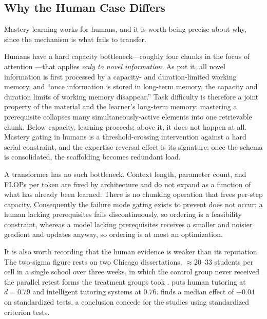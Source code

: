 \documentclass[11pt]{article}
\theoremstyle{plain}
\theoremstyle{definition}
\theoremstyle{remark}
\begin{document}
\subsection{Why the Human Case Differs}
\label{sec:human}

Mastery learning works for humans, and it is worth being precise about why, since
the mechanism is what fails to transfer.

Humans have a hard capacity bottleneck---roughly four chunks in the focus of
attention \citep{cowan2001magical}---that applies \emph{only to novel
information}. As \citet{sweller2019cognitive} put it, all novel information is
first processed by a capacity- and duration-limited working memory, and ``once
information is stored in long-term memory, the capacity and duration limits of
working memory disappear.'' Task difficulty is therefore a joint property of the
material and the learner's long-term memory: mastering a prerequisite collapses
many simultaneously-active elements into one retrievable chunk. Below capacity,
learning proceeds; above it, it does not happen at all. Mastery gating in humans
is a threshold-crossing intervention against a hard serial constraint, and the
expertise reversal effect \citep{kalyuga2003expertise} is its signature: once the
schema is consolidated, the scaffolding becomes redundant load.

A transformer has no such bottleneck. Context length, parameter count, and FLOPs
per token are fixed by architecture and do not expand as a function of what has
already been learned. There is no chunking operation that frees per-step
capacity. Consequently the failure mode gating exists to prevent does not occur:
a human lacking prerequisites fails discontinuously, so ordering is a feasibility
constraint, whereas a model lacking prerequisites receives a smaller and noisier
gradient and updates anyway, so ordering is at most an optimization.

It is also worth recording that the human evidence is weaker than its reputation.
The two-sigma figure rests on two Chicago dissertations, ${\approx}20$--$33$
students per cell in a single school over three weeks, in which the control group
never received the parallel retest forms the treatment groups took
\citep{anania1983influence,bloom1984}. \citet{vanlehn2011relative} puts
human tutoring at $d = 0.79$ and intelligent tutoring systems at $0.76$.
\citet{slavin1987mastery} finds a median effect of $+0.04$ on standardized tests,
a conclusion \citet{kulik1990effectiveness} concede for the studies using
standardized criterion tests.
\end{document}
